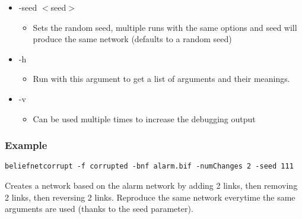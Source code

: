\begin{itemize}
\item -seed $<$seed$>$\begin{itemize}
\item Sets the random seed, multiple runs with the same options and seed will produce the same network (defaults to a random seed)\end{itemize}
\end{itemize}


\begin{itemize}
\item -h\begin{itemize}
\item Run with this argument to get a list of arguments and their meanings.\end{itemize}
\end{itemize}


\begin{itemize}
\item -v\begin{itemize}
\item Can be used multiple times to increase the debugging output\end{itemize}
\end{itemize}


\subsubsection*{Example}

{\tt }

{\tt beliefnetcorrupt -f corrupted -bnf alarm.bif -num\-Changes 2 -seed 111}

Creates a network based on the alarm network by adding 2 links, then removing 2 links, then reversing 2 links. Reproduce the same network everytime the same arguments are used (thanks to the seed parameter).

